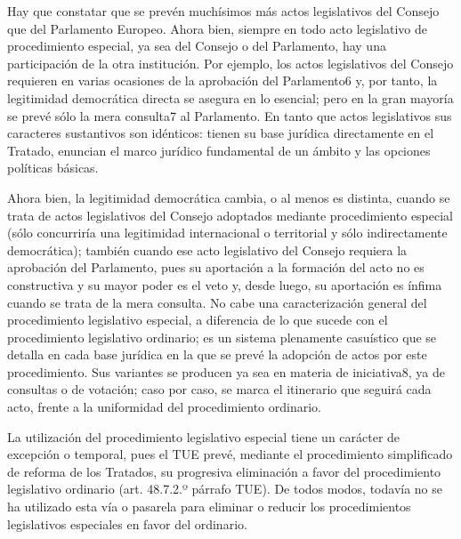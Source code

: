 \documentclass[10pt,a4paper]{article}
\begin{document}
Hay que constatar que se prevén muchísimos más actos legislativos del Consejo que del Parlamento Europeo. Ahora bien, siempre en todo acto legislativo de procedimiento especial, ya sea del Consejo o del Parlamento, hay una participación de la otra institución. Por ejemplo, los actos legislativos del Consejo requieren en varias ocasiones de la aprobación del Parlamento6 y, por tanto, la legitimidad democrática directa se asegura en lo esencial; pero en la gran mayoría se prevé sólo la mera consulta7 al Parlamento. En tanto que actos legislativos sus caracteres sustantivos son  idénticos: tienen su base jurídica directamente en el Tratado,  enuncian el marco jurídico fundamental de un ámbito y las opciones políticas básicas.

Ahora bien, la legitimidad democrática cambia, o al menos es distinta, cuando se trata de actos legislativos del Consejo adoptados mediante procedimiento especial (sólo concurriría una legitimidad internacional o territorial y sólo indirectamente democrática); también cuando ese acto legislativo del Consejo requiera la aprobación del Parlamento, pues su aportación a la formación del acto no es constructiva y su mayor poder es el veto y, desde luego, su aportación es ínfima cuando se trata de la mera consulta. No cabe una caracterización general del procedimiento legislativo especial, a diferencia de lo que sucede con el procedimiento legislativo ordinario; es un sistema plenamente casuístico que se detalla en cada base jurídica en la que se prevé la adopción de actos por este procedimiento. Sus variantes se producen ya sea en materia de iniciativa8, ya de consultas o de votación; caso por caso, se marca el itinerario que seguirá cada acto, frente a la uniformidad del procedimiento ordinario.

La utilización del procedimiento legislativo especial tiene un carácter de excepción o temporal, pues el TUE prevé, mediante el procedimiento simplificado de reforma de los Tratados, su progresiva eliminación a favor del procedimiento legislativo ordinario (art. 48.7.2.º párrafo TUE). De todos modos, todavía no se ha utilizado esta vía o pasarela para eliminar o reducir los procedimientos legislativos especiales en favor del ordinario.
\end{document}
